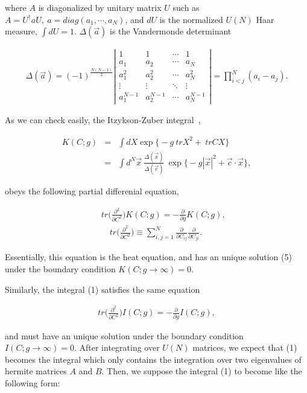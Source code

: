 \documentclass[a4paper,12pt]{article}
\begin{document}
\noindent where $A$ is diagonalized by unitary matrix $U$ such as $A\! =\! U^{\dagger}aU, \> a\! =\! diag(a_1,\cdots ,a_N)$, and $dU$ is the normalized $U(N)$ Haar measure, $\int \! dU \! =\! 1$. $\Delta (\vec{a})$ is the Vandermonde determinant 

\begin{eqnarray}
	\Delta (\vec{a})=(-1)^{\frac{N(N-1)}{2}}
	\left| \begin{array}{cccc}
	1 & 1 & \cdots & 1 \\
	a_1 & a_2 & \cdots & a_N \\
	a_1^2 & a_2^2 & \cdots & a_N^2 \\
	\vdots & \vdots & \ddots & \vdots \\
	a_1^{N-1} & a_2^{N-1} & \cdots & a_N^{N-1}
	\end{array} \right|
	=\prod_{i<j}^N (a_i-a_j).
\end{eqnarray}

As we can check easily, the Itzykson-Zuber integral~\cite{itz}, 

\begin{eqnarray}
	K(C;g) \! \! \! & = & \! \! \! \int dX \exp \Big\{ -g\> trX^2 
	+\> trCX \Big\} \nonumber \\
	& = & \! \! \! \int d^N\vec{x} \> 
	\frac{\Delta (\vec{x})}{\Delta (\vec{c})} \> 
	\exp \Big\{ -g|\vec{x}|^2+\vec{c}\cdot \vec{x} \Big\},
\end{eqnarray}

\noindent obeys the following partial differenial equation, 

\begin{eqnarray}
	& & tr\Big( \frac{\partial^2}{\partial C^2}\Big) K(C;g)
	=-\frac{\partial}{\partial g} K(C;g), \\
	& & \quad tr\Big( \frac{\partial^2}{\partial C^2}\Big) \equiv 
	\sum_{i,j=1}^N \frac{\partial}{\partial C_{ij}}
	\frac{\partial}{\partial C_{ji}}. \nonumber
\end{eqnarray}

\noindent Essentially, this equation is the heat equation, and has an unique solution (5) under the boundary condition $K(C;g\! \to \! \infty)\! =\! 0$.

Similarly, the integral (1) satisfies the same equation 

\begin{eqnarray}
	tr\Big( \frac{\partial^2}{\partial C^2}\Big) I(C;g)
	=-\frac{\partial}{\partial g} I(C;g),
\end{eqnarray}

\noindent and must have an unique solution under the boundary condition $I(C;g\! \to \! \infty)\! =\! 0$. After integrating over $U(N)$ matrices, we expect that (1) becomes the integral which only contains the integration over two eigenvalues of hermite matrices $A$ and $B$. Then, we suppose the integral (1) to become like the following form: 
\end{document}
